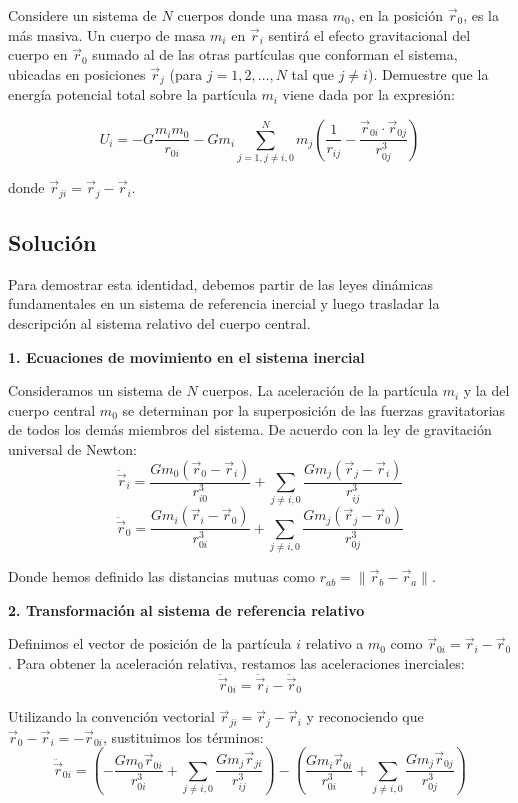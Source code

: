 \documentclass[12pt, letterpaper]{article}
\begin{document}
Considere un sistema de $N$ cuerpos donde una masa $m_0$, en la posición $\vec{r}_0$, es la más masiva. Un cuerpo de masa $m_i$ en $\vec{r}_i$ sentirá el efecto gravitacional del cuerpo en $\vec{r}_0$ sumado al de las otras partículas que conforman el sistema, ubicadas en posiciones $\vec{r}_j$ (para $j = 1, 2, \dots, N$ tal que $j \neq i$). Demuestre que la energía potencial total sobre la partícula $m_i$ viene dada por la expresión:

$$ U_i = -G \frac{m_i m_0}{r_{0i}} - G m_i \sum_{j=1, j \neq i, 0}^N m_j \left( \frac{1}{r_{ij}} - \frac{\vec{r}_{0i} \cdot \vec{r}_{0j}}{r_{0j}^3} \right) $$

donde $\vec{r}_{ji} = \vec{r}_j - \vec{r}_i$.


\subsection{Solución}


Para demostrar esta identidad, debemos partir de las leyes dinámicas fundamentales en un sistema de referencia inercial y luego trasladar la descripción al sistema relativo del cuerpo central.

\textbf{1. Ecuaciones de movimiento en el sistema inercial}

Consideramos un sistema de $N$ cuerpos. La aceleración de la partícula $m_i$ y la del cuerpo central $m_0$ se determinan por la superposición de las fuerzas gravitatorias de todos los demás miembros del sistema. De acuerdo con la ley de gravitación universal de Newton:
$$ \ddot{\vec{r}}_i = \frac{G m_0 (\vec{r}_0 - \vec{r}_i)}{r_{i0}^3} + \sum_{j \neq i, 0} \frac{G m_j (\vec{r}_j - \vec{r}_i)}{r_{ij}^3} $$
$$ \ddot{\vec{r}}_0 = \frac{G m_i (\vec{r}_i - \vec{r}_0)}{r_{0i}^3} + \sum_{j \neq i, 0} \frac{G m_j (\vec{r}_j - \vec{r}_0)}{r_{0j}^3} $$

Donde hemos definido las distancias mutuas como $r_{ab} = \|\vec{r}_b - \vec{r}_a\|$.

\textbf{2. Transformación al sistema de referencia relativo}

Definimos el vector de posición de la partícula $i$ relativo a $m_0$ como $\vec{r}_{0i} = \vec{r}_i - \vec{r}_0$. Para obtener la aceleración relativa, restamos las aceleraciones inerciales:
$$ \ddot{\vec{r}}_{0i} = \ddot{\vec{r}}_i - \ddot{\vec{r}}_0 $$

Utilizando la convención vectorial $\vec{r}_{ji} = \vec{r}_j - \vec{r}_i$ y reconociendo que $\vec{r}_0 - \vec{r}_i = -\vec{r}_{0i}$, sustituimos los términos:
$$ \ddot{\vec{r}}_{0i} = \left( - \frac{G m_0 \vec{r}_{0i}}{r_{0i}^3} + \sum_{j \neq i, 0} \frac{G m_j \vec{r}_{ji}}{r_{ij}^3} \right) - \left( \frac{G m_i \vec{r}_{0i}}{r_{0i}^3} + \sum_{j \neq i, 0} \frac{G m_j \vec{r}_{0j}}{r_{0j}^3} \right) $$
\end{document}
